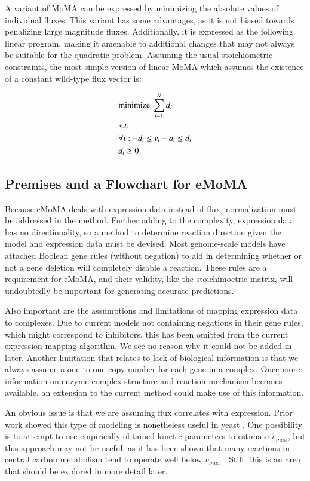 \documentclass[phd,tocprelim]{cornell}
\theoremstyle{break}
\begin{document}
A variant of MoMA can be expressed by minimizing the absolute values of individual fluxes.
This variant has some advantages, as it is not biased towards penalizing large magnitude fluxes. Additionally,
it is expressed as the following linear program, making it amenable to additional changes that
may not always be suitable for the quadratic problem. Assuming the usual stoichiometric constraints,
the most simple version of linear MoMA which assumes the existence of a constant wild-type flux vector is:

\begin{align*}
&\textnormal{minimize}\ \sum^N_{i=1}d_i  \\
&s.t.\\
&\forall i: -d_i \le v_i-a_i \le d_i \\
&d_i \ge 0
\end{align*}

\subsection{Premises and a Flowchart for eMoMA}
Because eMoMA deals with expression data instead of flux, normalization must be addressed in the method.
Further adding to the complexity, expression data has no directionality, so a method to determine 
reaction direction given the model and expression data must be devised. Most genome-scale models have
attached Boolean gene rules (without negation) to aid in determining whether or not a gene deletion will
completely disable a reaction. These rules are a requirement for eMoMA, and their validity, like the
stoichimoetric matrix, will undoubtedly be important for generating accurate predictions.

Also important are the assumptions and limitations of mapping expression data to complexes. Due to 
current models not containing negations in their gene rules, which might correspond to inhibitors,
this has been omitted from the current expression mapping algorithm. We see no reason why it could not
be added in later. Another limitation that relates to lack of biological information is that we always
assume a one-to-one copy number for each gene in a complex. Once more information on enzyme complex
structure and reaction mechanism becomes available, an extension to the current method could make use
of this information.

An obvious issue is that we are assuming flux correlates with expression. Prior
work showed this type of modeling is nonetheless useful in yeast \cite{Lee2012}. One possibility
is to attempt to use empirically obtained kinetic parameters to estimate $v_{max}$, but this
approach may not be useful, as it has been shown that many reactions in central carbon
metabolism tend to operate well below $v_{max}$ \cite{Bennett2010}. Still, this is an area that should
be explored in more detail later.
\end{document}
